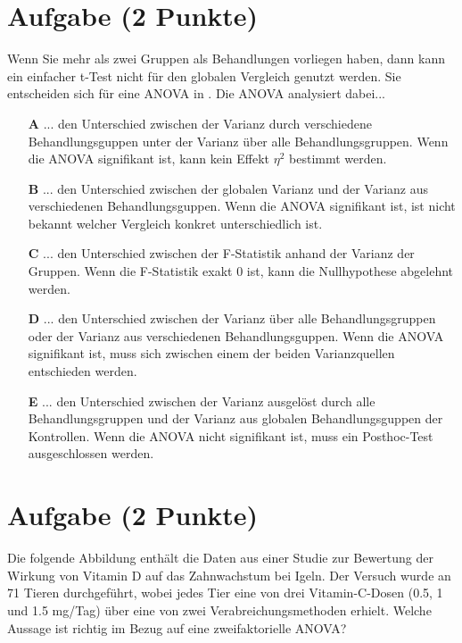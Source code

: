 \documentclass[a4paper, 9pt]{scrartcl}\usepackage[]{graphicx}\usepackage[]{xcolor}
\begin{document}
\section{Aufgabe \hfill (2 Punkte)}




Wenn Sie mehr als zwei Gruppen als Behandlungen vorliegen haben, dann kann ein einfacher t-Test nicht für den globalen Vergleich genutzt werden. Sie entscheiden sich für eine ANOVA in \Rlogo. Die ANOVA analysiert dabei...



\begin{enumerate}
\item [\textbf{A} \msquare] ... den Unterschied zwischen der Varianz durch verschiedene Behandlungsguppen unter der Varianz über alle Behandlungsgruppen. Wenn die ANOVA signifikant ist, kann kein Effekt $\eta^2$ bestimmt werden.
\item [\textbf{B} \msquare] ... den Unterschied zwischen der globalen Varianz und der Varianz aus verschiedenen Behandlungsguppen. Wenn die ANOVA signifikant ist, ist nicht bekannt welcher Vergleich konkret unterschiedlich ist.
\item [\textbf{C} \msquare] ... den Unterschied zwischen der F-Statistik anhand der Varianz der Gruppen. Wenn die F-Statistik exakt 0 ist, kann die Nullhypothese abgelehnt werden.
\item [\textbf{D} \msquare] ... den Unterschied zwischen der Varianz über alle Behandlungsgruppen oder der Varianz aus verschiedenen Behandlungsguppen. Wenn die ANOVA signifikant ist, muss sich zwischen einem der beiden Varianzquellen entschieden werden.
\item [\textbf{E} \msquare] ... den Unterschied zwischen der Varianz ausgelöst durch alle Behandlungsgruppen und der Varianz aus globalen Behandlungsguppen der Kontrollen. Wenn die ANOVA nicht signifikant ist, muss ein Posthoc-Test ausgeschlossen werden.
\end{enumerate} 

\section{Aufgabe \hfill (2 Punkte)}



Die folgende Abbildung enthält die Daten aus einer Studie zur Bewertung der Wirkung von Vitamin D auf das Zahnwachstum bei Igeln. Der Versuch wurde an 71 Tieren durchgeführt, wobei jedes Tier eine von  drei Vitamin-C-Dosen (0.5, 1 und 1.5 mg/Tag) über eine von zwei Verabreichungsmethoden erhielt. Welche Aussage ist richtig im Bezug auf eine zweifaktorielle ANOVA?
\end{document}
